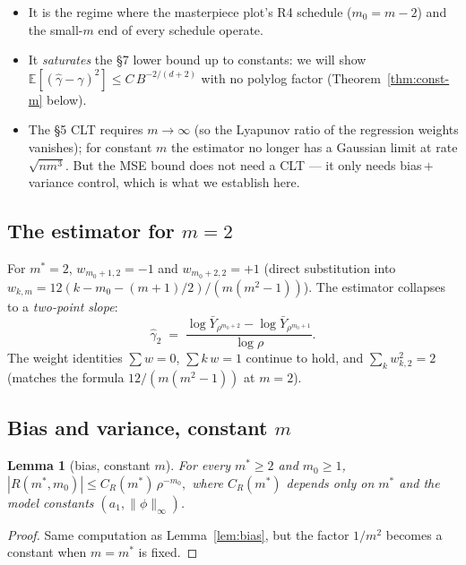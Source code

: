 \documentclass[11pt]{article}
\newcommand{\E}{\mathbb{E}}
\theoremstyle{plain}
\newtheorem{lemma}[theorem]{Lemma}
\theoremstyle{definition}
\begin{document}
\begin{itemize}
  \item It is the regime where the masterpiece plot's R4 schedule
        ($m_0 = m-2$) and the small-$m$ end of every schedule
        operate.
  \item It \emph{saturates} the §7 lower bound up to constants:
        we will show $\E[(\hat\gamma-\gamma)^{2}] \le C\,B^{-2/(d+2)}$
        with no polylog factor (Theorem~\ref{thm:const-m} below).
  \item The §5 CLT requires $m \to \infty$ (so the Lyapunov ratio of
        the regression weights vanishes); for constant $m$ the
        estimator no longer has a Gaussian limit at rate
        $\sqrt{nm^{3}}$. But the MSE bound does not need a CLT --- it
        only needs bias\,$+$\,variance control, which is what we
        establish here.
\end{itemize}

\subsection*{The estimator for $m=2$}

For $m^{\ast}=2$, $w_{m_0+1,2} = -1$ and $w_{m_0+2,2} = +1$
(direct substitution into $w_{k,m} = 12(k-m_0-(m+1)/2)/(m(m^2-1))$).
The estimator collapses to a \emph{two-point slope}:
\begin{equation}\label{eq:two-point-estimator}
  \hat\gamma_{2}
  \;=\;
  \frac{\log \bar Y_{\rho^{m_0+2}} - \log \bar Y_{\rho^{m_0+1}}}{\log\rho}.
\end{equation}
The weight identities $\sum w = 0$, $\sum k\,w = 1$ continue to hold,
and $\sum_k w_{k,2}^{2} = 2$ (matches the formula $12/(m(m^{2}-1))$
at $m=2$).

\subsection*{Bias and variance, constant $m$}

\begin{lemma}[bias, constant $m$]\label{lem:bias-const}
For every $m^{\ast}\ge 2$ and $m_0 \ge 1$,
\(
  |R(m^{\ast}, m_0)| \le C_R(m^{\ast})\,\rho^{-m_0},
\)
where $C_R(m^{\ast})$ depends only on $m^{\ast}$ and the model
constants $(a_1, \|\phi\|_\infty)$.
\end{lemma}

\begin{proof}
Same computation as Lemma~\ref{lem:bias}, but the factor $1/m^{2}$
becomes a constant when $m=m^{\ast}$ is fixed.
\end{proof}
\end{document}
